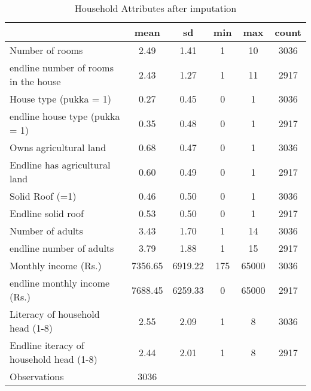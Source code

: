 \begin{table}[htbp]\centering
\def\sym#1{\ifmmode^{#1}\else\(^{#1}\)\fi}
\caption{Household Attributes after imputation\label {tab1}}
\begin{tabular}{l*{1}{ccccc}}
\toprule
                    &        mean&          sd&         min&         max&       count\\
\midrule
Number of rooms     &        2.49&        1.41&           1&          10&        3036\\
endline number of rooms in the house&        2.43&        1.27&           1&          11&        2917\\
House type (pukka = 1)&        0.27&        0.45&           0&           1&        3036\\
endline house type (pukka = 1)&        0.35&        0.48&           0&           1&        2917\\
Owns agricultural land&        0.68&        0.47&           0&           1&        3036\\
Endline has agricultural land&        0.60&        0.49&           0&           1&        2917\\
Solid Roof (=1)     &        0.46&        0.50&           0&           1&        3036\\
Endline solid roof  &        0.53&        0.50&           0&           1&        2917\\
Number of adults    &        3.43&        1.70&           1&          14&        3036\\
endline number of adults&        3.79&        1.88&           1&          15&        2917\\
Monthly income (Rs.)&     7356.65&     6919.22&         175&       65000&        3036\\
endline monthly income (Rs.)&     7688.45&     6259.33&           0&       65000&        2917\\
Literacy of household head (1-8)&        2.55&        2.09&           1&           8&        3036\\
Endline iteracy of household head (1-8)&        2.44&        2.01&           1&           8&        2917\\
\midrule
Observations        &        3036&            &            &            &            \\
\bottomrule
\end{tabular}
\end{table}
